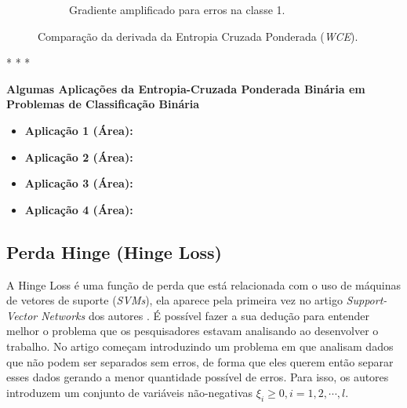 \begin{figure}[h!]
\begin{subfigure}[b]{0.48\textwidth}
        \caption{Gradiente amplificado para erros na classe 1.}
        \label{fig:wce-derivada-alpha1}
    \end{subfigure}
    
    \caption{Comparação da derivada da Entropia Cruzada Ponderada (\textit{WCE}).}
    \label{fig:binary-weighted-cross-entropy-derivada-comparacao}
\end{figure}

\medskip
\begin{center}
 * * *
\end{center}
\medskip

\textbf{Algumas Aplicações da Entropia-Cruzada Ponderada Binária em Problemas de Classificação Binária} 
\vspace{1em}

\begin{itemize}
    \item \textbf{Aplicação 1 (Área):}
    \item \textbf{Aplicação 2 (Área):}
    \item \textbf{Aplicação 3 (Área):}
    \item \textbf{Aplicação 4 (Área):}
\end{itemize}

\subsection{Perda Hinge (Hinge Loss)} 

A Hinge Loss é uma função de perda que está relacionada com o uso de máquinas de vetores de suporte (\textit{SVMs}), ela aparece pela primeira vez no artigo \textit{Support-Vector Networks} dos autores \textcite{HingeLoss}. É possível fazer a sua dedução para entender melhor o problema que os pesquisadores estavam analisando ao desenvolver o trabalho. No artigo \textcite{HingeLoss} começam introduzindo um problema em que analisam dados que não podem ser separados sem erros, de forma que eles querem então separar esses dados gerando a menor quantidade possível de erros. Para isso, os autores introduzem um conjunto de variáveis não-negativas $\xi_i \ge 0, i = 1, 2, \cdots, l$. 

